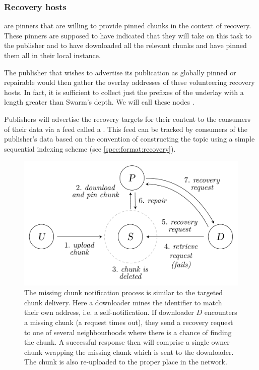 \subsubsection{Recovery hosts}

 are pinners that are willing to provide pinned chunks in the context of recovery. These pinners are supposed to have indicated that they will take on this task to the publisher and to have downloaded all the relevant chunks and have pinned them all in their local instance. 

The publisher that wishes to advertise its publication as globally pinned or repairable would then gather the overlay addresses of these volunteering recovery hosts. In fact, it is sufficient to collect just the prefixes of the underlay with a length greater than Swarm's depth. We will call these nodes .

Publishers will advertise the recovery targets for their content to the consumers of their data via a feed called a . This feed can be tracked by consumers of the publisher's data based on the convention of constructing the topic using a simple sequential indexing scheme (see \ref{spec:format:recovery}). 

\begin{figure}[htbp]
\centering
\includegraphics[width=.8\textwidth]{fig/missing-chunk-notification.pdf} \caption[Missing chunk notification process \statusgreen]{The missing chunk notification process is similar to the targeted chunk delivery. Here a downloader mines the identifier to match their own address, i.e. a self-notification. If downloader $D$ encounters a missing chunk (a request times out), they send a recovery request to one of several neighbourhoods where there is a chance of finding the chunk. A successful response then will comprise a single owner chunk wrapping the missing chunk which is sent to the downloader. The chunk is also re-uploaded to the proper place in the network.}
\label{fig:missing-chunk-notification}
\end{figure}

